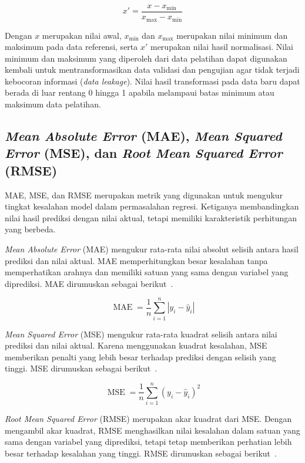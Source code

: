 \documentclass[10pt,conference]{IEEEtran}
\begin{document}
\begin{equation}\label{eq:minmax}
x'=\frac{x-x_{\min}}{x_{\max}-x_{\min}}
\end{equation}

Dengan \(x\) merupakan nilai awal, \(x_{\min}\) dan \(x_{\max}\) merupakan nilai minimum dan maksimum pada data referensi, serta \(x'\) merupakan nilai hasil normalisasi. Nilai minimum dan maksimum yang diperoleh dari data pelatihan dapat digunakan kembali untuk mentransformasikan data validasi dan pengujian agar tidak terjadi kebocoran informasi (\textit{data leakage}). Nilai hasil transformasi pada data baru dapat berada di luar rentang 0 hingga 1 apabila melampaui batas minimum atau maksimum data pelatihan.

\subsection{\textit{Mean Absolute Error} (MAE), \textit{Mean Squared Error} (MSE), dan \textit{Root Mean Squared Error} (RMSE)}

MAE, MSE, dan RMSE merupakan metrik yang digunakan untuk mengukur tingkat kesalahan model dalam permasalahan regresi. Ketiganya membandingkan nilai hasil prediksi dengan nilai aktual, tetapi memiliki karakteristik perhitungan yang berbeda.

\textit{Mean Absolute Error} (MAE) mengukur rata-rata nilai absolut selisih antara hasil prediksi dan nilai aktual. MAE memperhitungkan besar kesalahan tanpa memperhatikan arahnya dan memiliki satuan yang sama dengan variabel yang diprediksi. MAE dirumuskan sebagai berikut~\cite{regression-metrics}.

\begin{equation}\label{eq:mae}
\operatorname{MAE}=\frac{1}{n}\sum_{i=1}^{n}|y_i-\hat{y}_i|
\end{equation}

\textit{Mean Squared Error} (MSE) mengukur rata-rata kuadrat selisih antara nilai prediksi dan nilai aktual. Karena menggunakan kuadrat kesalahan, MSE memberikan penalti yang lebih besar terhadap prediksi dengan selisih yang tinggi. MSE dirumuskan sebagai berikut~\cite{regression-metrics}.

\begin{equation}\label{eq:mse}
\operatorname{MSE}=\frac{1}{n}\sum_{i=1}^{n}(y_i-\hat{y}_i)^2
\end{equation}

\textit{Root Mean Squared Error} (RMSE) merupakan akar kuadrat dari MSE. Dengan mengambil akar kuadrat, RMSE menghasilkan nilai kesalahan dalam satuan yang sama dengan variabel yang diprediksi, tetapi tetap memberikan perhatian lebih besar terhadap kesalahan yang tinggi. RMSE dirumuskan sebagai berikut~\cite{regression-metrics}.
\end{document}
